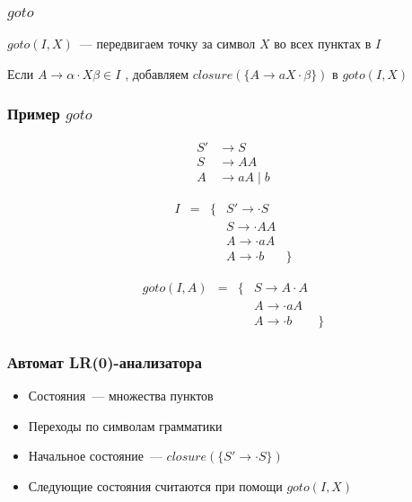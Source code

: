 \documentclass{beamer}
\newcommand{\lritem}[3]{#1 \to #2 \cdot #3}
\begin{document}
\begin{frame}[fragile]
  \transwipe[direction=90]
  \frametitle{$goto$}


  \begin{center}
    $goto(I, X)$~--- передвигаем точку за символ $X$ во всех пунктах в $I$
  \end{center}

  \begin{center}
    Если $\lritem{A}{\alpha}{X \beta} \in I$ , добавляем $closure(\{ \lritem{A}{aX}{\beta} \})$ в $goto(I, X)$
  \end{center}
\end{frame}


\begin{frame}[fragile]
  \transwipe[direction=90]
  \frametitle{Пример $goto$}

  \begin{align*}
    S' &\to S \\
    S  &\to A A \\
    A  &\to a A \mid b
  \end{align*}

  \[
  \begin{array}{rcclr}
    I & = & \{ &\lritem{S'}{}{S} & \\
      &   &    &\lritem{S}{}{AA} & \\
      &   &    &\lritem{A}{}{aA} & \\
      &   &    &\lritem{A}{}{b}  &\}
  \end{array}
  \]

  \[
  \begin{array}{rcclr}
    goto(I, A) & = & \{ & \lritem{S}{A}{A} & \\
               &   &    & \lritem{A}{}{aA} & \\
               &   &    & \lritem{A}{}{b}  & \}
  \end{array}
  \]

\end{frame}

\begin{frame}[fragile]
  \transwipe[direction=90]
  \frametitle{Автомат LR(0)-анализатора}
  \begin{itemize}
    \item Состояния~--- множества пунктов
    \item Переходы по символам грамматики
    \item Начальное состояние~--- $closure(\{\lritem{S'}{}{S}\})$
    \item Следующие состояния считаются при помощи $goto(I, X)$
  \end{itemize}

\end{frame}
\end{document}
